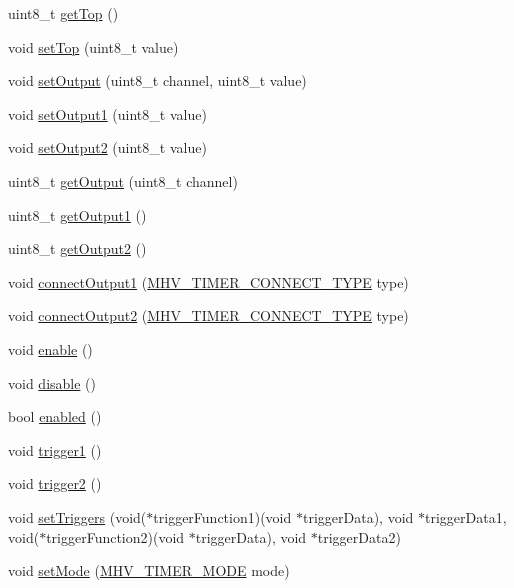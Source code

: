 \begin{DoxyCompactItemize}
\item 
uint8\-\_\-t \hyperlink{class_m_h_v___timer8_a37004c8305a689239cde4a9f6fa51fa5}{get\-Top} ()
\item 
void \hyperlink{class_m_h_v___timer8_a1e2da36ae04182ffe36f3e7504744168}{set\-Top} (uint8\-\_\-t value)
\item 
void \hyperlink{class_m_h_v___timer8_a5b165bd717b85730b2d92314b9d16617}{set\-Output} (uint8\-\_\-t channel, uint8\-\_\-t value)
\item 
void \hyperlink{class_m_h_v___timer8_afcb083692e774d84872b85a82a95c0a6}{set\-Output1} (uint8\-\_\-t value)
\item 
void \hyperlink{class_m_h_v___timer8_ac36f7d0d7827acf902bb850b81f2d76f}{set\-Output2} (uint8\-\_\-t value)
\item 
uint8\-\_\-t \hyperlink{class_m_h_v___timer8_a643aa48eeb3653e233423d372c77af59}{get\-Output} (uint8\-\_\-t channel)
\item 
uint8\-\_\-t \hyperlink{class_m_h_v___timer8_a079f492f84cbb561013afdcfcc23bb14}{get\-Output1} ()
\item 
uint8\-\_\-t \hyperlink{class_m_h_v___timer8_a7d941cc774d1fda7f94b14d191b8d7e1}{get\-Output2} ()
\item 
void \hyperlink{class_m_h_v___timer8_a8babe8403f7cd117145f7a6faf79c755}{connect\-Output1} (\hyperlink{_m_h_v___timer8_8h_a6655b3f5fdc629857c7c337fa819421a}{\-M\-H\-V\-\_\-\-T\-I\-M\-E\-R\-\_\-\-C\-O\-N\-N\-E\-C\-T\-\_\-\-T\-Y\-P\-E} type)
\item 
void \hyperlink{class_m_h_v___timer8_a95e432f5240fd44204dd3fc203a8ef7b}{connect\-Output2} (\hyperlink{_m_h_v___timer8_8h_a6655b3f5fdc629857c7c337fa819421a}{\-M\-H\-V\-\_\-\-T\-I\-M\-E\-R\-\_\-\-C\-O\-N\-N\-E\-C\-T\-\_\-\-T\-Y\-P\-E} type)
\item 
void \hyperlink{class_m_h_v___timer8_a963a2426ca2cd67242039e31760202eb}{enable} ()
\item 
void \hyperlink{class_m_h_v___timer8_acb53366943386bf683ab97a8de42eee8}{disable} ()
\item 
bool \hyperlink{class_m_h_v___timer8_a28aa46400cf8c1f279e9588f1a912b65}{enabled} ()
\item 
void \hyperlink{class_m_h_v___timer8_a29d11c49e658ba8d2936b62f0fa75806}{trigger1} ()
\item 
void \hyperlink{class_m_h_v___timer8_a4c99d0b6b3b546fcb73b59540f7f88c4}{trigger2} ()
\item 
void \hyperlink{class_m_h_v___timer8_a6baeeb61a53f8156cde82b348a421093}{set\-Triggers} (void($\ast$trigger\-Function1)(void $\ast$trigger\-Data), void $\ast$trigger\-Data1, void($\ast$trigger\-Function2)(void $\ast$trigger\-Data), void $\ast$trigger\-Data2)
\item 
void \hyperlink{class_m_h_v___timer8_ad18f37f37ce07f2d39b8f3cac4b2fb82}{set\-Mode} (\hyperlink{_m_h_v___timer8_8h_ae9de6a07a79f63ce9eeb6ba2bc9b053d}{\-M\-H\-V\-\_\-\-T\-I\-M\-E\-R\-\_\-\-M\-O\-D\-E} mode)
\end{DoxyCompactItemize}

